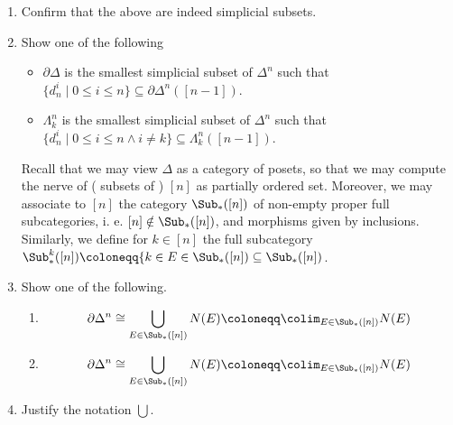 \begin{enumerate}[label=(\alph*)]
    
    \item 
    Confirm that the above are indeed simplicial subsets.

    \item 
    Show one of the following 
    \begin{itemize}
    
        \item 
        $ \partial \Delta $ is the smallest simplicial subset of $ \Delta^n $ such that $ \{ d_n^i \mid 0 \leq i \leq n \} \subseteq \partial \Delta^n ( [ n - 1 ] ) $.

        \item 
        $\Lambda_k^n$ is the smallest simplicial subset of $ \Delta^n $ such that $ \{ d_n^i \mid 0 \leq i \leq n \wedge i \neq k \} \subseteq \Lambda^n_k ( [ n - 1 ] )$.
        
    \end{itemize}

Recall that we may view $ \Delta $ as a category of posets, so that we may compute the nerve of ( subsets of ) $ [ n ] $ as partially ordered set.
Moreover, we may associate to $ [ n ] $ the category $ \Sub_* ( [ n ] ) $ of non-empty proper full subcategories, i. e. $ [ n ] \notin \Sub_* ( [ n ] ) $, and morphisms given by inclusions.
Similarly, we define for $ k \in [ n ] $ the full subcategory $ \Sub_*^k ( [ n ] ) \coloneqq \{ k \in E \in \Sub_* ( [ n ] ) \subseteq  \Sub_* ( [ n ] )$.

    \item 
    Show one of the following.

    \begin{enumerate}
        \item 
        \[
            \partial \Delta^n
            \cong 
            \bigcup_{ E \in \Sub_* ( [ n ] ) } N ( E ) \coloneqq 
            \colim_{ E \in \Sub_* ( [ n ] ) } N ( E ) 
        \]

        \item 
        \[
            \partial \Delta^n
            \cong
            \bigcup_{ E \in \Sub_* ( [ n ] ) } N ( E ) \coloneqq 
            \colim_{ E \in \Sub_* ( [ n ] ) } N ( E ) 
        \]
    \end{enumerate}

    \item 
    Justify the notation $ \bigcup $.
    
\end{enumerate}

